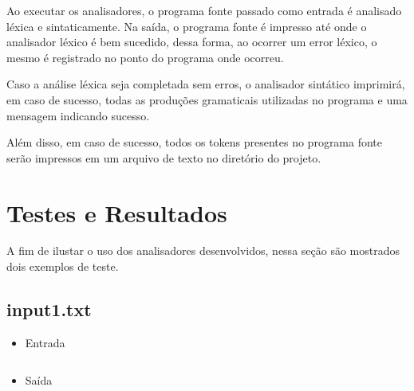 \documentclass[a4paper,12pt]{report}
\begin{document}
Ao executar os analisadores, o programa fonte passado como entrada é analisado
léxica e sintaticamente. Na saída, o programa fonte é impresso até onde o analisador
léxico é bem sucedido, dessa forma, ao ocorrer um error léxico, o mesmo é registrado
no ponto do programa onde ocorreu.

Caso a análise léxica seja completada sem erros, o analisador sintático imprimirá,
em caso de sucesso, todas as produções gramaticais utilizadas no programa e uma mensagem
indicando sucesso.

Além disso, em caso de sucesso, todos os tokens presentes no programa fonte serão impressos
em um arquivo de texto no diretório do projeto.

\section{Testes e Resultados}

A fim de ilustar o uso dos analisadores desenvolvidos, nessa seção são mostrados
dois exemplos de teste.

\subsection{input1.txt}

\begin{itemize}
 \item Entrada
 
 \begin{mdframed}[linecolor=black, leftline=false, rightline=false, backgroundcolor=gray!20!white]
    \inputminted[linenos, fontsize=\footnotesize]{text}{../src/input/input1.txt}
\end{mdframed}
 
 \item Saída

\begin{mdframed}[linecolor=black, leftline=false, rightline=false, backgroundcolor=gray!20!white]
    \inputminted[linenos, fontsize=\footnotesize]{text}{../src/tokens1.txt}
\end{mdframed}
 
\begin{mdframed}[linecolor=black, leftline=false, rightline=false, backgroundcolor=gray!20!white]
    \inputminted[linenos, fontsize=\footnotesize]{text}{../src/output1.txt}
\end{mdframed}
 
\end{itemize}
\end{document}
